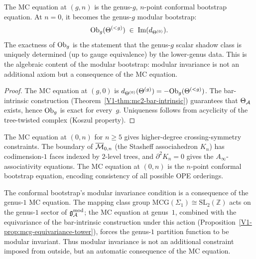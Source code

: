 \begin{corollary}
The MC equation at $(g, n)$ is the genus-$g$, $n$-point
conformal bootstrap equation. At $n = 0$, it becomes the
genus-$g$ modular bootstrap:
\begin{equation}%
\Ob_g(\Theta^{(<g)}) \;\in\; \mathrm{Im}(d_{\Theta^{(0)}}).
\end{equation}
The exactness of $\mathrm{Ob}_g$ is the statement that the genus-$g$
scalar shadow class is uniquely determined \textup{(}up to gauge
equivalence\textup{)} by the lower-genus data. This is the
algebraic content of the modular bootstrap: modular invariance
is not an additional axiom but a consequence of the MC equation.
\end{corollary}

\begin{proof}
The MC equation at $(g, 0)$ is
$d_{\Theta^{(0)}}(\Theta^{(g)}) = -\mathrm{Ob}_g(\Theta^{(<g)})$.
The bar-intrinsic construction
(Theorem~\ref*{V1-thm:mc2-bar-intrinsic}) guarantees that
$\Theta_{\mathcal{A}}$ exists, hence $\mathrm{Ob}_g$ is exact for
every~$g$. Uniqueness follows from acyclicity of the
tree-twisted complex (Koszul property).
\end{proof}

\begin{remark}
The MC equation at $(0, n)$ for $n \geq 5$ gives higher-degree
crossing-symmetry constraints. The boundary of
$\overline{\mathcal{M}}_{0,n}$ (the Stasheff associahedron $K_n$) has
codimension-$1$ faces indexed by $2$-level trees, and
$\partial^2 K_n = 0$ gives the $A_\infty$-associativity
equations. The MC equation at $(0, n)$ is the $n$-point
conformal bootstrap equation, encoding consistency of all
possible OPE orderings.
\end{remark}

\begin{remark}
The conformal bootstrap's modular invariance condition is
a consequence of the genus-$1$ MC equation. The mapping class
group $\mathrm{MCG}(\Sigma_1) \cong \mathrm{SL}_2(\mathbb{Z})$
acts on the genus-$1$ sector of $\mathfrak{g}_{\mathcal{A}}^{\mathrm{mod}}$; the MC equation at
genus~$1$, combined with the equivariance of the bar-intrinsic
construction under this action
(Proposition~\ref{V1-prop:mcg-equivariance-tower}), forces the
genus-$1$ partition function to be modular invariant.
Thus modular invariance is not an additional constraint
imposed from outside, but an automatic consequence of the
MC equation.
\end{remark}


